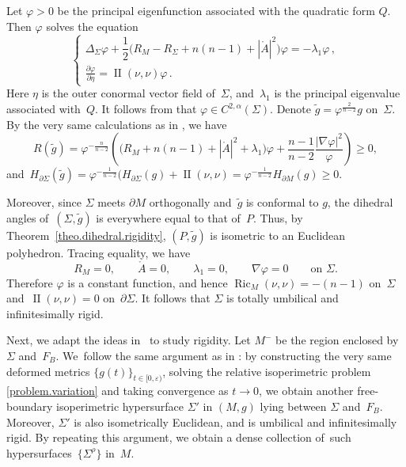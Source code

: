 \documentclass[pdftex]{sigma}
\numberwithin{equation}{section}
\theoremstyle{definition}
\DeclareMathOperator{\Ric}{Ric}
\DeclareMathOperator{\secondfund}{II}
\newcommand{\pa}[2]{\frac{\partial #1}{\partial #2}}
\begin{document}
Let $\varphi>0$ be the principal eigenfunction associated with the quadratic form $Q$. Then $\varphi$ solves the equation
\begin{equation}
\begin{cases}
\Delta_\Sigma \varphi+\dfrac{1}{2}\big(R_M-R_\Sigma + n(n-1)+|\mathring{A}|^2\big)\varphi = -\lambda_1\varphi\,,
\\
\displaystyle\pa{\varphi}{\eta}=\secondfund(\nu,\nu)\varphi\,.
\end{cases}
\end{equation}
Here $\eta$ is the outer conormal vector field of~$\Sigma$, and~$\lambda_1$ is the principal eigenvalue associated with~$Q$. It follows from \cite[Lemma 4.1]{li2019dihedral} that $\varphi\in C^{2,\alpha}(\Sigma)$. Denote $\tilde{g}=\varphi^{\frac{2}{n-2}}g$ on~$\Sigma$. By the very same calculations as in \cite[equations~(4.6) and~(4.7)]{li2019dihedral}, we have
\[R(\tilde{g})=\varphi^{-\frac{n}{n-2}}\left(\big(R_M+n(n-1)+|\mathring{A}|^2+\lambda_1\big)\varphi+\frac{n-1}{n-2}\frac{|\nabla \varphi|^2}{\varphi}\right)\ge 0,\]
and~$H_{\partial \Sigma}(\tilde g)=\varphi^{-\frac{1}{n-2}}(H_{\partial \Sigma}(g)+\secondfund(\nu,\nu)=\varphi^{-\frac{1}{n-2}} H_{\partial M}(g)\ge 0$.

Moreover, since $\Sigma$ meets $\partial M$ orthogonally and~$\tilde{g}$ is conformal to $g$, the dihedral angles of~$(\Sigma,\tilde{g})$ is everywhere equal to that of~$P$. Thus, by Theorem~\ref{theo.dihedral.rigidity}, $(P,\tilde{g})$ is isometric to an Euclidean polyhedron. Tracing equality, we have
\[
R_M=0,\qquad \mathring A=0,\qquad \lambda_1=0,\qquad \nabla \varphi=0 \qquad \text{on }\Sigma.
\]
Therefore $\varphi$ is a constant function, and hence $\Ric_M(\nu,\nu)=-(n-1)$ on~$\Sigma$ and~$\secondfund(\nu,\nu)=0$ on~$\partial \Sigma$. It follows that $\Sigma$ is totally umbilical and infinitesimally rigid.


Next, we adapt the ideas in~\cite{CarlottoChodoshEichmair2016effective,ChodoshEichmairMoraru2018splitting} to study rigidity. Let $M^-$ be the region enclosed by~$\Sigma$ and~$F_B$. We~follow the same argument as in \cite[Section~4]{li2019dihedral}: by constructing the very same deformed metrics $\{g(t)\}_{t\in [0,\varepsilon)}$, solving the relative isoperimetric problem \eqref{problem.variation} and taking convergence as $t\rightarrow 0$, we obtain another free-boundary isoperimetric hypersurface $\Sigma'$ in $(M,g)$ lying between $\Sigma$ and~$F_B$. Moreover, $\Sigma'$ is also isometrically Euclidean, and is umbilical and infinitesimally rigid. By repeating this argument, we obtain a dense collection of~such hypersurfaces~$\{\Sigma^\rho\}$ in~$M$.
\end{document}

